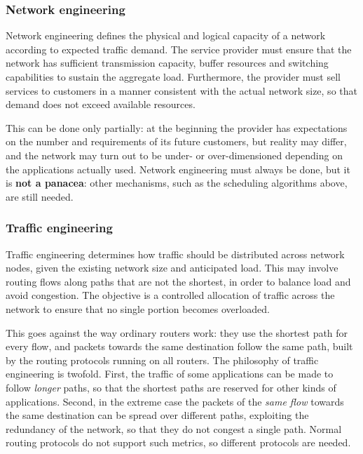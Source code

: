 \subsubsection*{Network engineering}

Network engineering defines the physical and logical capacity of a network according to expected traffic demand. The service provider must ensure that the network has sufficient transmission capacity, buffer resources and switching capabilities to sustain the aggregate load. Furthermore, the provider must sell services to customers in a manner consistent with the actual network size, so that demand does not exceed available resources.

This can be done only partially: at the beginning the provider has expectations on the number and requirements of its future customers, but reality may differ, and the network may turn out to be under- or over-dimensioned depending on the applications actually used. Network engineering must always be done, but it is \textbf{not a panacea}: other mechanisms, such as the scheduling algorithms above, are still needed.

\subsubsection*{Traffic engineering}

Traffic engineering determines how traffic should be distributed across network nodes, given the existing network size and anticipated load. This may involve routing flows along paths that are not the shortest, in order to balance load and avoid congestion. The objective is a controlled allocation of traffic across the network to ensure that no single portion becomes overloaded.

This goes against the way ordinary routers work: they use the shortest path for every flow, and packets towards the same destination follow the same path, built by the routing protocols running on all routers. The philosophy of traffic engineering is twofold. First, the traffic of some applications can be made to follow \emph{longer} paths, so that the shortest paths are reserved for other kinds of applications. Second, in the extreme case the packets of the \emph{same flow} towards the same destination can be spread over different paths, exploiting the redundancy of the network, so that they do not congest a single path. Normal routing protocols do not support such metrics, so different protocols are needed.

